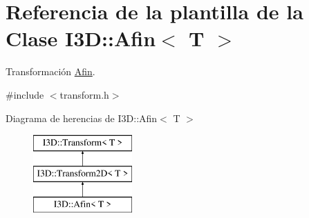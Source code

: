 \hypertarget{class_i3_d_1_1_afin}{}\section{Referencia de la plantilla de la Clase I3D\+:\+:Afin$<$ T $>$}
\label{class_i3_d_1_1_afin}


Transformación \hyperlink{class_i3_d_1_1_afin}{Afin}.  




{\ttfamily \#include $<$transform.\+h$>$}

Diagrama de herencias de I3D\+:\+:Afin$<$ T $>$\begin{figure}[H]
\begin{center}
\leavevmode
\includegraphics[height=3.000000cm]{class_i3_d_1_1_afin}
\end{center}
\end{figure}
